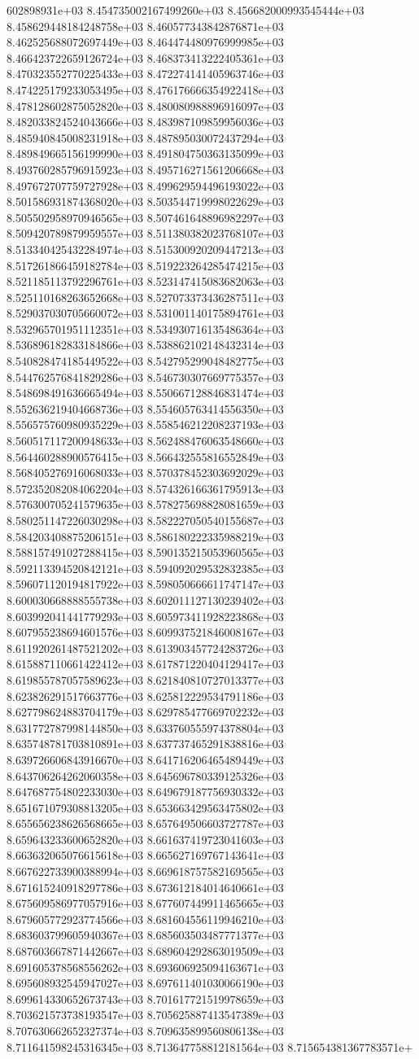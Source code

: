 602898931e+03	8.454735002167499260e+03	8.456682000993545444e+03	8.458629448184248758e+03	8.460577343842876871e+03	8.462525688072697449e+03	8.464474480976999985e+03	8.466423722659126724e+03	8.468373413222405361e+03	8.470323552770225433e+03	8.472274141405963746e+03	8.474225179233053495e+03	8.476176666354922418e+03	8.478128602875052820e+03	8.480080988896916097e+03	8.482033824524043666e+03	8.483987109859956036e+03	8.485940845008231918e+03	8.487895030072437294e+03	8.489849665156199990e+03	8.491804750363135099e+03	8.493760285796915923e+03	8.495716271561206668e+03	8.497672707759727928e+03	8.499629594496193022e+03	8.501586931874368020e+03	8.503544719998022629e+03	8.505502958970946565e+03	8.507461648896982297e+03	8.509420789879959557e+03	8.511380382023768107e+03	8.513340425432284974e+03	8.515300920209447213e+03	8.517261866459182784e+03	8.519223264285474215e+03	8.521185113792296761e+03	8.523147415083682063e+03	8.525110168263652668e+03	8.527073373436287511e+03	8.529037030705660072e+03	8.531001140175894761e+03	8.532965701951112351e+03	8.534930716135486364e+03	8.536896182833184866e+03	8.538862102148432314e+03	8.540828474185449522e+03	8.542795299048482775e+03	8.544762576841829286e+03	8.546730307669775357e+03	8.548698491636665494e+03	8.550667128846831474e+03	8.552636219404668736e+03	8.554605763414556350e+03	8.556575760980935229e+03	8.558546212208237193e+03	8.560517117200948633e+03	8.562488476063548660e+03	8.564460288900576415e+03	8.566432555816552849e+03	8.568405276916068033e+03	8.570378452303692029e+03	8.572352082084062204e+03	8.574326166361795913e+03	8.576300705241579635e+03	8.578275698828081659e+03	8.580251147226030298e+03	8.582227050540155687e+03	8.584203408875206151e+03	8.586180222335988219e+03	8.588157491027288415e+03	8.590135215053960565e+03	8.592113394520842121e+03	8.594092029532832385e+03	8.596071120194817922e+03	8.598050666611747147e+03	8.600030668888555738e+03	8.602011127130239402e+03	8.603992041441779293e+03	8.605973411928223868e+03	8.607955238694601576e+03	8.609937521846008167e+03	8.611920261487521202e+03	8.613903457724283726e+03	8.615887110661422412e+03	8.617871220404129417e+03	8.619855787057589623e+03	8.621840810727013377e+03	8.623826291517663776e+03	8.625812229534791186e+03	8.627798624883704179e+03	8.629785477669702232e+03	8.631772787998144850e+03	8.633760555974378804e+03	8.635748781703810891e+03	8.637737465291838816e+03	8.639726606843916670e+03	8.641716206465489449e+03	8.643706264262060358e+03	8.645696780339125326e+03	8.647687754802233030e+03	8.649679187756930332e+03	8.651671079308813205e+03	8.653663429563475802e+03	8.655656238626568665e+03	8.657649506603727787e+03	8.659643233600652820e+03	8.661637419723041603e+03	8.663632065076615618e+03	8.665627169767143641e+03	8.667622733900388994e+03	8.669618757582169565e+03	8.671615240918297786e+03	8.673612184014640661e+03	8.675609586977057916e+03	8.677607449911465665e+03	8.679605772923774566e+03	8.681604556119946210e+03	8.683603799605940367e+03	8.685603503487771377e+03	8.687603667871442667e+03	8.689604292863019509e+03	8.691605378568556262e+03	8.693606925094163671e+03	8.695608932545947027e+03	8.697611401030066190e+03	8.699614330652673743e+03	8.701617721519978659e+03	8.703621573738193547e+03	8.705625887413547389e+03	8.707630662652327374e+03	8.709635899560806138e+03	8.711641598245316345e+03	8.713647758812181564e+03	8.715654381367783571e+